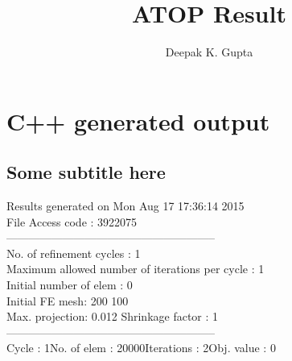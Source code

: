 \documentclass{article}
\title{ATOP Result}
\author{Deepak K. Gupta}
\begin{document}
\maketitle
\section{C++ generated output}
\subsection{Some subtitle here}
{\selectfont
Results generated  on Mon Aug 17 17:36:14 2015
\\File Access code : 3922075\\ 
--------------------------------------------------------\\ 
No. of refinement cycles : 1\\
Maximum allowed number of iterations per cycle : 1\\
Initial number of elem : 0\\ 
Initial FE mesh: 200 100\\ 
Max. projection: 0.012 Shrinkage factor : 1\\ 
--------------------------------------------------------\\ 
Cycle : 1\qquad No. of elem : 20000\qquad Iterations : 2\qquad Obj. value : 0\qquad 
}
\begin{figure}[H] 
\centering 
\begin{subfigure}{.45\linewidth} \centering 
{}  
\end{subfigure}  
\hfill  
\begin{subfigure}{.45\linewidth} \centering 
{}  
\end{subfigure}  
\end{figure}  
\end{document}
